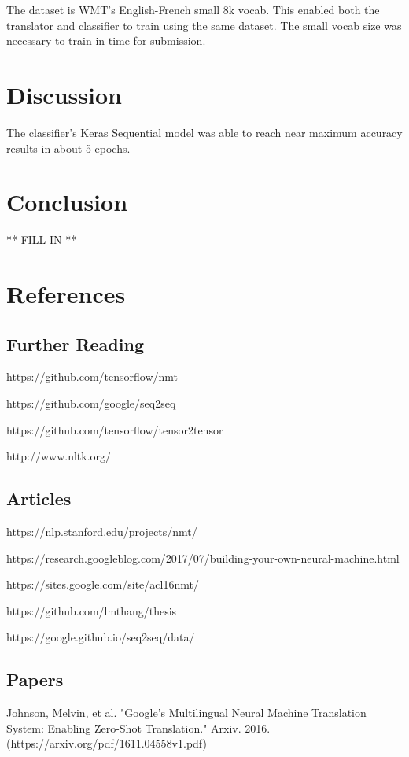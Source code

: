 \documentclass[10pt,a4paper]{article}
\begin{document}
  The dataset is WMT's English-French small 8k vocab. This enabled both the translator and classifier to train using the same dataset. The small vocab size was necessary to train in time for submission.

\section{Discussion}
	The classifier's Keras Sequential model was able to reach near maximum accuracy results in about 5 epochs.

\section{Conclusion}
** FILL IN **

\section{References}

\subsection{Further Reading}

https://github.com/tensorflow/nmt

https://github.com/google/seq2seq

https://github.com/tensorflow/tensor2tensor

http://www.nltk.org/

\subsection{Articles}

https://nlp.stanford.edu/projects/nmt/

https://research.googleblog.com/2017/07/building-your-own-neural-machine.html

https://sites.google.com/site/acl16nmt/

https://github.com/lmthang/thesis

https://google.github.io/seq2seq/data/

\subsection{Papers}

Johnson, Melvin, et al. "Google’s Multilingual Neural Machine Translation System: Enabling Zero-Shot Translation." Arxiv. 2016.
(https://arxiv.org/pdf/1611.04558v1.pdf)
\newline
\end{document}
